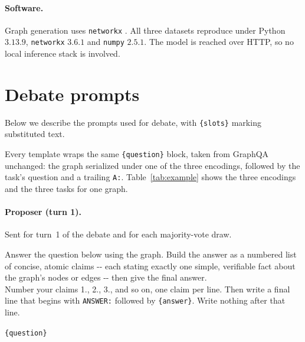 \documentclass[11pt]{article}
\begin{document}
\paragraph{Software.} Graph generation uses \texttt{networkx} \citep{hagberg2008networkx}.
All three datasets reproduce under Python $3.13.9$, \texttt{networkx} $3.6.1$ and
\texttt{numpy} $2.5.1$. The model is reached over HTTP, so no local inference stack is
involved.

\newenvironment{promptblock}%
  {\begin{list}{}{\setlength{\leftmargin}{1em}\setlength{\rightmargin}{0pt}%
   \setlength{\topsep}{4pt}\setlength{\partopsep}{0pt}\setlength{\parsep}{4pt}}%
   \item[]\small}%
  {\end{list}}

\section{Debate prompts}
\label{sec:prompts}
Below we describe the prompts used for debate, with \texttt{\{slots\}} marking
substituted text.

Every template wraps the same \texttt{\{question\}} block, taken from GraphQA
\citep{fatemi2024talk} unchanged: the graph serialized under one of the three
encodings, followed by the task's question and a trailing \texttt{A:}.
Table~\ref{tab:example} shows the three encodings and the three tasks for one graph. 

\paragraph{Proposer (turn 1).}
Sent for turn~1 of the debate and for each majority-vote draw.

\begin{promptblock}
Answer the question below using the graph. Build the answer as a numbered list of
concise, atomic claims -{}- each stating exactly one simple, verifiable fact about the
graph's nodes or edges -{}- then give the final answer.\\
Number your claims 1., 2., 3., and so on, one claim per line. Then write a final line
that begins with \texttt{ANSWER:} followed by \texttt{\{answer\}}. Write nothing after
that line.

\texttt{\{question\}}
\end{promptblock}
\end{document}
